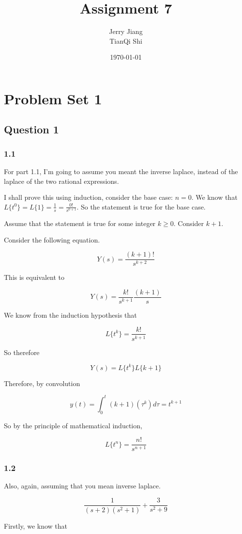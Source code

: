 \documentclass[titlepage]{article}
\title{Assignment 7}
\date{\today}
\author{Jerry Jiang\\ TianQi Shi}
\begin{document}
\maketitle

\noindent
\section*{Problem Set 1}
\subsection*{Question 1}

\subsubsection*{1.1}
For part 1.1, I'm going to assume you meant the inverse laplace, instead of the
laplace of the two rational expressions.

I shall prove this using induction, consider the base case: $n = 0$.
We know that $L\{t^0\} = L\{1\} = \frac{1}{s} = \frac{0!}{s^{0 + 1}}$.
So the statement is true for the base case.

Assume that the statement is true for some integer $k \ge 0$. Consider $k + 1$.

Consider the following equation.

$$Y(s) = \frac{(k+1)!}{s^{k+2}}$$

This is equivalent to

$$Y(s) = \frac{k!}{s^{k+1}}\frac{(k+1)}{s}$$

We know from the induction hypothesis that

$$L\{t^k\} = \frac{k!}{s^{k+1}}$$

So therefore

$$Y(s) = L\{t^k\}L\{k+1\}$$

Therefore, by convolution

$$y(t) = \int_{0}^{t}(k+1)(\tau^k) d\tau = t^{k+1}$$

So by the principle of mathematical induction,

$$L\{t^n\} = \frac{n!}{s^{n+1}}$$

\subsubsection*{1.2}
Also, again, assuming that you mean inverse laplace.

$$\frac{1}{(s+2)(s^2 + 1)} + \frac{3}{s^2 + 9}$$

Firstly, we know that
\end{document}
